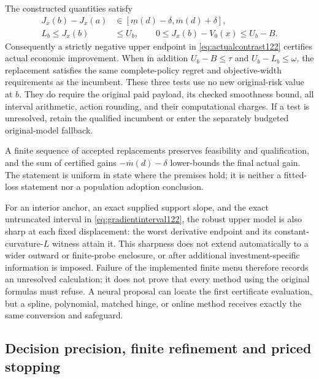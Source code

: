 \begin{theorem}
\label{thm:payloadsafeguard122}
The constructed quantities satisfy
\begin{align}
 J_x(b)-J_x(a)&\in
   [\underline m(d)-\delta,\overline m(d)+\delta],\label{eq:actualcontrast122}\\
 L_b\le J_x(b)&\le U_b,\qquad
 0\le J_x(b)-V_0(x)\le U_b-B.\label{eq:payloadqualification122}
\end{align}
Consequently a strictly negative upper endpoint in
\eqref{eq:actualcontrast122} certifies actual economic improvement.
When in addition $U_b-B\le\tau$ and $U_b-L_b\le\omega$, the replacement
satisfies the same complete-policy regret and objective-width requirements
as the incumbent. These three tests use no new original-risk value at $b$.
They do require the original paid payload, its checked smoothness bound,
all interval arithmetic, action rounding, and their computational charges.
If a test is unresolved, retain the qualified incumbent or enter the
separately budgeted original-model fallback.

A finite sequence of accepted replacements preserves feasibility and
qualification, and the sum of certified gains
$-\overline m(d)-\delta$ lower-bounds the final actual gain.
The statement is uniform in state where the premises hold; it is neither
a fitted-loss statement nor a population adoption conclusion.
\end{theorem}

For an interior anchor, an exact supplied support slope, and the exact
untruncated interval in \eqref{eq:gradientinterval122}, the robust upper
model is also sharp at each fixed displacement: the worst derivative
endpoint and its constant-curvature-$L$ witness attain it. This sharpness
does not extend automatically to a wider outward or finite-probe enclosure,
or after additional investment-specific information is imposed. Failure
of the implemented finite menu therefore records an unresolved calculation;
it does not prove that every method using the original formulas must refuse. A neural proposal can locate the first certificate evaluation, but
a spline, polynomial, matched hinge, or online method receives exactly the
same conversion and safeguard.

\subsection{Decision precision, finite refinement and priced stopping}

